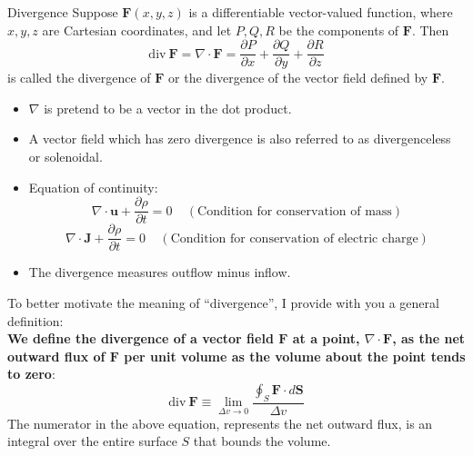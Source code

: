 \documentclass[10pt]{beamer}
\begin{document}
\begin{frame}[allowframebreaks]{Divergence}
Suppose $\mathbf{F}(x, y, z)$ is a differentiable vector-valued function, where $x, y, z$ are
Cartesian coordinates, and let $P, Q, R$ be the components of $\mathbf{F}$. Then
$$\text{div}~\mathbf{F} = \nabla\cdot\mathbf{F} = \dfrac{\partial P}{\partial x} + \dfrac{\partial Q}{\partial y} + \dfrac{\partial R}{\partial z}$$
is called the {\color{blue}divergence} of $\mathbf{F}$ or the {\color{blue}divergence of the vector field} defined by $\mathbf{F}$.
\begin{itemize}
	\item $\nabla$ is pretend to be a vector in the dot product.
	\item A vector field which has {\color{red}zero} divergence is also referred to as {\color{blue}divergenceless or solenoidal}.
	\item Equation of continuity:
	$$\nabla\cdot \mathbf{u} + \dfrac{\partial \rho}{\partial t} = 0~~~~~(\text{Condition for conservation of mass})$$
	$$\nabla\cdot \mathbf{J} + \dfrac{\partial \rho}{\partial t} = 0~~~~~(\text{Condition for conservation of electric charge})$$
	\item The divergence measures outflow minus inflow.
\end{itemize}
To better motivate the meaning of ``divergence'', I provide with you a general definition:\\
{\bf We define the divergence of a vector field $\mathbf{F}$ at a point, $\nabla\cdot\mathbf{F}$, as the net outward flux of $\mathbf{F}$ per unit volume as the volume about the point tends to zero}:
$$\text{div}~\mathbf{F}\equiv\lim\limits_{\Delta v\rightarrow 0}\dfrac{\oint_S\mathbf{F}\cdot d\mathbf{S}}{\Delta v}$$
The numerator in the above equation, represents the net outward flux, is an integral over the entire surface $S$ that bounds the volume.
\end{frame}
\end{document}

